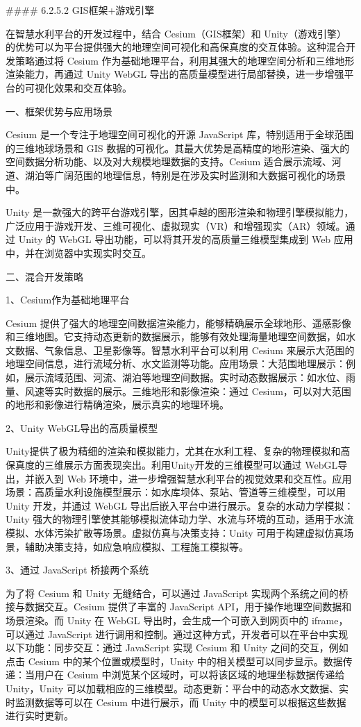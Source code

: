 \#\#\#\# 6.2.5.2 GIS框架+游戏引擎

在智慧水利平台的开发过程中，结合 Cesium（GIS框架）和 Unity（游戏引擎）的优势可以为平台提供强大的地理空间可视化和高保真度的交互体验。这种混合开发策略通过将 Cesium 作为基础地理平台，利用其强大的地理空间分析和三维地形渲染能力，再通过 Unity WebGL 导出的高质量模型进行局部替换，进一步增强平台的可视化效果和交互体验。

一、框架优势与应用场景

Cesium 是一个专注于地理空间可视化的开源 JavaScript 库，特别适用于全球范围的三维地球场景和 GIS 数据的可视化。其最大优势是高精度的地形渲染、强大的空间数据分析功能、以及对大规模地理数据的支持。Cesium 适合展示流域、河道、湖泊等广阔范围的地理信息，特别是在涉及实时监测和大数据可视化的场景中。

Unity 是一款强大的跨平台游戏引擎，因其卓越的图形渲染和物理引擎模拟能力，广泛应用于游戏开发、三维可视化、虚拟现实（VR）和增强现实（AR）领域。通过 Unity 的 WebGL 导出功能，可以将其开发的高质量三维模型集成到 Web 应用中，并在浏览器中实现实时交互。

二、混合开发策略

1、Cesium作为基础地理平台

Cesium 提供了强大的地理空间数据渲染能力，能够精确展示全球地形、遥感影像和三维地图。它支持动态更新的数据展示，能够有效处理海量地理空间数据，如水文数据、气象信息、卫星影像等。智慧水利平台可以利用 Cesium 来展示大范围的地理空间信息，进行流域分析、水文监测等功能。应用场景：大范围地理展示：例如，展示流域范围、河流、湖泊等地理空间数据。实时动态数据展示：如水位、雨量、风速等实时数据的展示。三维地形和影像渲染：通过 Cesium，可以对大范围的地形和影像进行精确渲染，展示真实的地理环境。

2、Unity WebGL导出的高质量模型

Unity提供了极为精细的渲染和模拟能力，尤其在水利工程、复杂的物理模拟和高保真度的三维展示方面表现突出。利用Unity开发的三维模型可以通过 WebGL导出，并嵌入到 Web 环境中，进一步增强智慧水利平台的视觉效果和交互性。应用场景：高质量水利设施模型展示：如水库坝体、泵站、管道等三维模型，可以用 Unity 开发，并通过 WebGL 导出后嵌入平台中进行展示。复杂的水动力学模拟：Unity 强大的物理引擎使其能够模拟流体动力学、水流与环境的互动，适用于水流模拟、水体污染扩散等场景。虚拟仿真与决策支持：Unity 可用于构建虚拟仿真场景，辅助决策支持，如应急响应模拟、工程施工模拟等。

3、通过 JavaScript 桥接两个系统

为了将 Cesium 和 Unity 无缝结合，可以通过 JavaScript 实现两个系统之间的桥接与数据交互。Cesium 提供了丰富的 JavaScript API，用于操作地理空间数据和场景渲染。而 Unity 在 WebGL 导出时，会生成一个可嵌入到网页中的 iframe，可以通过 JavaScript 进行调用和控制。通过这种方式，开发者可以在平台中实现以下功能：同步交互：通过 JavaScript 实现 Cesium 和 Unity 之间的交互，例如点击 Cesium 中的某个位置或模型时，Unity 中的相关模型可以同步显示。数据传递：当用户在 Cesium 中浏览某个区域时，可以将该区域的地理坐标数据传递给 Unity，Unity 可以加载相应的三维模型。动态更新：平台中的动态水文数据、实时监测数据等可以在 Cesium 中进行展示，而 Unity 中的模型可以根据这些数据进行实时更新。

